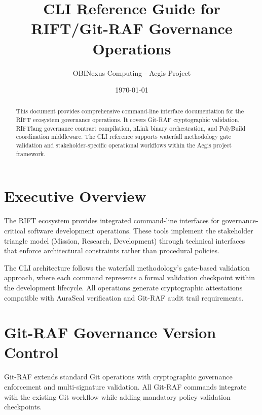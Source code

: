 \documentclass[11pt,letterpaper]{article}
\title{CLI Reference Guide for RIFT/Git-RAF Governance Operations}
\author{OBINexus Computing - Aegis Project}
\date{\today}
\begin{document}
\maketitle

\begin{abstract}
This document provides comprehensive command-line interface documentation for the RIFT ecosystem governance operations. It covers Git-RAF cryptographic validation, RIFTlang governance contract compilation, nLink binary orchestration, and PolyBuild coordination middleware. The CLI reference supports waterfall methodology gate validation and stakeholder-specific operational workflows within the Aegis project framework.
\end{abstract}

\tableofcontents
\newpage

\section{Executive Overview}

The RIFT ecosystem provides integrated command-line interfaces for governance-critical software development operations. These tools implement the stakeholder triangle model (Mission, Research, Development) through technical interfaces that enforce architectural constraints rather than procedural policies.

The CLI architecture follows the waterfall methodology's gate-based validation approach, where each command represents a formal validation checkpoint within the development lifecycle. All operations generate cryptographic attestations compatible with AuraSeal verification and Git-RAF audit trail requirements.

\section{Git-RAF Governance Version Control}

Git-RAF extends standard Git operations with cryptographic governance enforcement and multi-signature validation. All Git-RAF commands integrate with the existing Git workflow while adding mandatory policy validation checkpoints.
\end{document}
